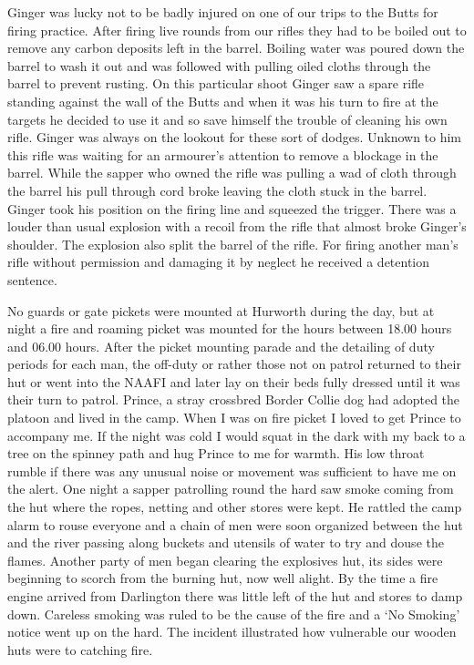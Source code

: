 Ginger was lucky not to be badly injured on one of our trips to the
Butts for firing practice. After firing live rounds from our rifles
they had to be boiled out to remove any carbon deposits left in the
barrel. Boiling water was poured down the barrel to wash it out and
was followed with pulling oiled cloths through the barrel to prevent
rusting. On this particular shoot Ginger saw a spare rifle standing
against the wall of the Butts and when it was his turn to fire at the
targets he decided to use it and so save himself the trouble of
cleaning his own rifle. Ginger was always on the lookout for these
sort of dodges. Unknown to him this rifle was waiting for an
armourer's attention to remove a blockage in the barrel. While the
sapper who owned the rifle was pulling a wad of cloth through the
barrel his pull through cord broke leaving the cloth stuck in the
barrel. Ginger took his position on the firing line and squeezed the
trigger. There was a louder than usual explosion with a recoil from
the rifle that almost broke Ginger's shoulder. The explosion also
split the barrel of the rifle. For firing another man's rifle without
permission and damaging it by neglect he received a detention
sentence.

No guards or gate pickets were mounted at Hurworth during the day, but
at night a fire and roaming picket was mounted for the hours between
18.00 hours and 06.00 hours. After the picket mounting parade and the
detailing of duty periods for each man, the off-duty or rather those
not on patrol returned to their hut or went into the NAAFI and later
lay on their beds fully dressed until it was their turn to patrol.
Prince, a stray crossbred Border Collie dog had adopted the platoon
and lived in the camp. When I was on fire picket I loved to get
Prince to accompany me. If the night was cold I would squat in the
dark with my back to a tree on the spinney path and hug Prince to me
for warmth.  His low throat rumble if there was any unusual noise or
movement was sufficient to have me on the alert. One night a sapper
patrolling round the hard saw smoke coming from the hut where the
ropes, netting and other stores were kept. He rattled the camp alarm
to rouse everyone and a chain of men were soon organized between the
hut and the river passing along buckets and utensils of water to try
and douse the flames. Another party of men began clearing the
explosives hut, its sides were beginning to scorch from the burning
hut, now well alight. By the time a fire engine arrived from
Darlington there was little left of the hut and stores to damp
down. Careless smoking was ruled to be the cause of the fire and a `No
Smoking' notice went up on the hard. The incident illustrated how
vulnerable our wooden huts were to catching fire.

